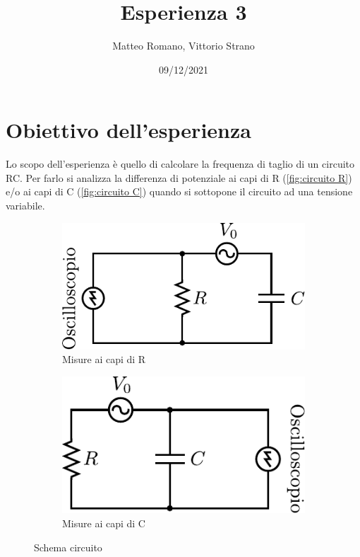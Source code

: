 \documentclass[11pt, a4paper]{article}
\title{Esperienza 3}
\author{Matteo Romano, Vittorio Strano}
\date{09/12/2021}
\numberwithin{equation}{section} %
\begin{document}
\maketitle

\tableofcontents

\section{Obiettivo dell'esperienza}

Lo scopo dell'esperienza è quello di calcolare la frequenza di taglio di un circuito RC. Per farlo si analizza la differenza di potenziale ai capi di R (\autoref{fig:circuito R}) e/o ai capi di C (\autoref{fig:circuito C}) quando si sottopone il circuito ad una tensione variabile.

\begin{figure}[ht!]
    \centering
    \begin{subfigure}[c]{.3\textwidth}
        \includegraphics[width=\textwidth]{circuito_osc_R.pdf}
        \caption{Misure ai capi di R}
        \label{fig:circuito R}
    \end{subfigure}
    \hspace{1in}
    \begin{subfigure}[c]{.3\textwidth}
        \includegraphics[width=\textwidth]{circuito_osc_C.pdf}
        \caption{Misure ai capi di C}
        \label{fig:circuito C}
    \end{subfigure}
    \caption{Schema circuito}
  \end{figure}
\end{document}

